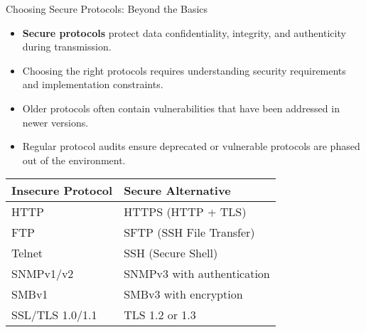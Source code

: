 \documentclass{beamer}
\begin{document}
                \begin{frame}{Choosing Secure Protocols: Beyond the Basics}
                \begin{itemize}
                    \item \textbf{Secure protocols} protect data confidentiality, integrity, and authenticity during transmission.
                    \item Choosing the right protocols requires understanding security requirements and implementation constraints.
                    \item Older protocols often contain vulnerabilities that have been addressed in newer versions.
                    \item Regular protocol audits ensure deprecated or vulnerable protocols are phased out of the environment.
                \end{itemize}
                
                \begin{tabular}{ll}
                \textbf{Insecure Protocol} & \textbf{Secure Alternative} \\
                \hline
                HTTP & HTTPS (HTTP + TLS) \\
                FTP & SFTP (SSH File Transfer) \\
                Telnet & SSH (Secure Shell) \\
                SNMPv1/v2 & SNMPv3 with authentication \\
                SMBv1 & SMBv3 with encryption \\
                SSL/TLS 1.0/1.1 & TLS 1.2 or 1.3 \\
                \end{tabular}
                \end{frame}
                
\end{document}
